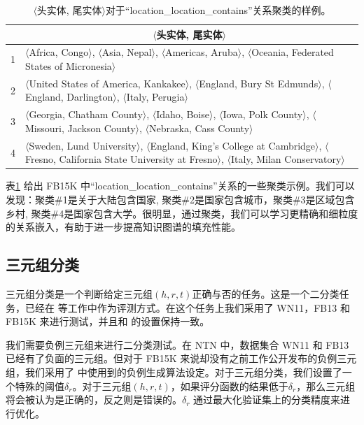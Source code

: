     \begin{table}[htb]
    \small
    \centering
    \caption{$\langle$头实体, 尾实体$\rangle$对于``location\_location\_contains''关系聚类的样例。}
     \label{label_1:cluster_example}
    \begin{tabular}{|c|p{}|}
    \hline
    & \multicolumn{1}{|c|}{$\langle$头实体, 尾实体$\rangle$} \\
    \hline
    1 & $\langle$Africa, Congo$\rangle$, $\langle$Asia, Nepal$\rangle$, $\langle$Americas, Aruba$\rangle$,  $\langle$Oceania, Federated States of Micronesia$\rangle$
    \\ \hline
    2 & $\langle$United States of America, Kankakee$\rangle$,
    $\langle$England, Bury St Edmunds$\rangle$,
    $\langle$England, Darlington$\rangle$, $\langle$Italy, Perugia$\rangle$ \\ \hline
    3 & $\langle$Georgia, Chatham County$\rangle$, $\langle$Idaho, Boise$\rangle$, $\langle$Iowa, Polk County$\rangle$, $\langle$Missouri, Jackson County$\rangle$, $\langle$Nebraska, Cass County$\rangle$
    \\ \hline
    4 & $\langle$Sweden, Lund University$\rangle$, $\langle$England, King's College at Cambridge$\rangle$, $\langle$Fresno, California State University at Fresno$\rangle$, $\langle$Italy, Milan Conservatory$\rangle$
    \\\hline
    \end{tabular}
    \end{table}

    表\ref{label_1:cluster_example} 给出 FB15K 中``location\_location\_contains''关系的一些聚类示例。我们可以发现：聚类\#1是关于大陆包含国家, 聚类\#2是国家包含城市，聚类\#3是区域包含乡村, 聚类\#4是国家包含大学。很明显，通过聚类，我们可以学习更精确和细粒度的关系嵌入，有助于进一步提高知识图谱的填充性能。


    \subsection{三元组分类}
    三元组分类是一个判断给定三元组$(h, r, t)$正确与否的任务。这是一个二分类任务，已经在  等工作中作为评测方式。在这个任务上我们采用了 WN11，FB13 和 FB15K 来进行测试，并且和 的设置保持一致。

    我们需要负例三元组来进行二分类测试。在 NTN  中，数据集合 WN11 和 FB13 已经有了负面的三元组。但对于 FB15K 来说却没有之前工作公开发布的负例三元组，我们采用了  中使用到的负例生成算法设定。对于三元组分类，我们设置了一个特殊的阈值$\delta_r$。对于三元组$(h,r,t)$，如果评分函数的结果低于$\delta_r$，那么三元组将会被认为是正确的，反之则是错误的。$\delta_r$ 通过最大化验证集上的分类精度来进行优化。


